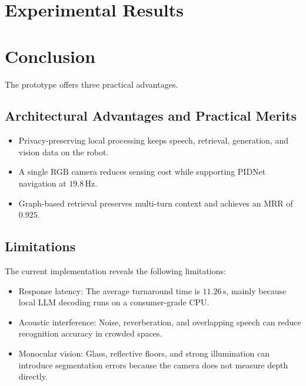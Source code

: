 \documentclass[conference]{IEEEtran}
\begin{document}
\section{Experimental Results}\label{sec5}


\section{Conclusion}\label{sec6}
%



The prototype offers three practical advantages.

\subsection{Architectural Advantages and Practical Merits}
\begin{itemize}
    \item Privacy-preserving local processing keeps speech, retrieval, generation, and vision data on the robot.
    \item A single RGB camera reduces sensing cost while supporting PIDNet navigation at $19.8\,\text{Hz}$.
    \item Graph-based retrieval preserves multi-turn context and achieves an MRR of $0.925$.
\end{itemize}

\subsection{Limitations}
The current implementation reveals the following limitations:
\begin{itemize}
    \item Response latency: The average turnaround time is $11.26\,\text{s}$, mainly because local LLM decoding runs on a consumer-grade CPU.
    \item Acoustic interference: Noise, reverberation, and overlapping speech can reduce recognition accuracy in crowded spaces.
    \item Monocular vision: Glass, reflective floors, and strong illumination can introduce segmentation errors because the camera does not measure depth directly.
\end{itemize}
\end{document}
